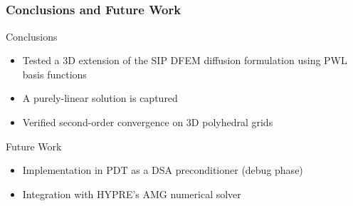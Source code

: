 \documentclass[]{beamer}
\begin{document}
\subsection{}
\begin{frame}[t]\frametitle{Conclusions and Future Work}
	\begin{block}{Conclusions}
		\begin{itemize}
			\item Tested a 3D extension of the SIP DFEM diffusion formulation using PWL basis functions
			\item A purely-linear solution is captured 
			\item Verified second-order convergence on 3D polyhedral grids
		\end{itemize}
	\end{block}
	\begin{block}{Future Work}
		\begin{itemize}
			\item Implementation in PDT as a DSA preconditioner (debug phase)
			\item Integration with HYPRE's AMG numerical solver
		\end{itemize}
	\end{block}
\end{frame}
\end{document}

